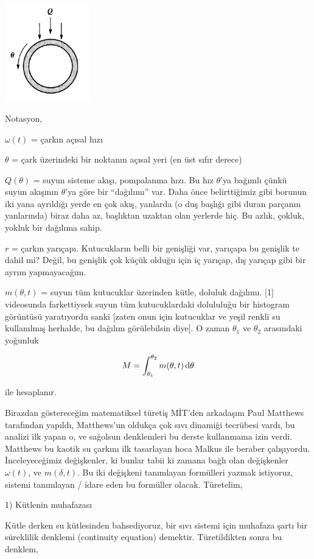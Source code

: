 \documentclass[12pt,fleqn]{article}\usepackage{../../common}
\begin{document}
\includegraphics[width=10em]{15_02.png}

Notasyon,

$\omega(t)$ = çarkın açısal hızı

$\theta$ = çark üzerindeki bir noktanın açısal yeri (en üst sıfır derece)

$Q(\theta)$ = suyun sisteme akışı, pompalanma hızı. Bu hız $\theta$'ya
bağımlı çünkü suyun akışının $\theta$'ya göre bir ``dağılımı'' var. Daha
önce belirttiğimiz gibi borunun iki yana ayrıldığı yerde en çok akış,
yanlarda (o duş başlığı gibi duran parçanın yanlarında) biraz daha az,
başlıktan uzaktan olan yerlerde hiç. Bu azlık, çokluk, yokluk bir dağılıma
sahip.

$r$ = çarkın yarıçapı. Kutucukların belli bir genişliği var, yarıçapa bu
genişlik te dahil mi? Değil, bu genişlik çok küçük olduğu için iç yarıçap,
dış yarıçap gibi bir ayrım yapmayacağım.

$m(\theta, t)$ = suyun tüm kutucuklar üzerinden kütle, doluluk
dağılımı. [1] videosunda farkettiysek suyun tüm kutucuklardaki dolululuğu
bir histogram görüntüsü yaratıyordu sanki [zaten onun için kutucuklar ve
yeşil renkli su kullanılmış herhalde, bu dağılım görülebilsin diye]. O
zaman $\theta_1$ ve $\theta_2$ arasındaki yoğunluk

$$ M = \int _{\theta_1}^{\theta_2} m(\theta, t) \,\mathrm{d}\theta $$

ile hesaplanır. 

Birazdan göstereceğim matematiksel türetiş MİT'den arkadaşım Paul Matthews
tarafından yapıldı, Matthews'un oldukça çok sıvı dinamiği tecrübesi vardı,
bu analizi ilk yapan o, ve sağolsun denklemleri bu derste kullanmama izin
verdi. Matthews bu kaotik su çarkını ilk tasarlayan hoca Malkus ile beraber
çalışıyordu. İnceleyeceğimiz değişkenler, ki bunlar tabii ki zamana bağlı olan
değişkenler $\omega(t)$, ve $m(\delta,t)$. Bu iki değişkeni tanımlayan
formülleri yazmak istiyoruz, sistemi tanımlayan / idare eden bu formüller
olacak. Türetelim, 

1) Kütlenin muhafazası

Kütle derken su kütlesinden bahsediyoruz, bir sıvı sistemi için muhafaza
şartı bir süreklilik denklemi (continuity equation) demektir. Türetildikten
sonra bu denklem,
\end{document}
